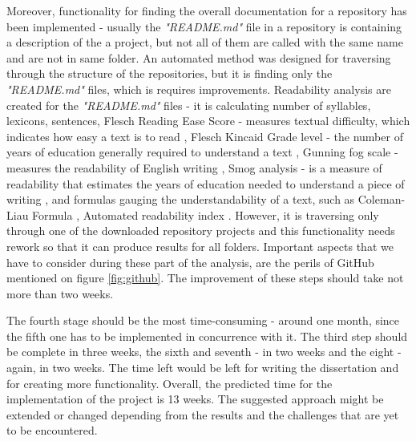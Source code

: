 Moreover, functionality for finding the overall documentation for a repository has been  implemented - usually the \textit{"README.md"} file in a repository is containing a description of the a project, but not all of them are called with the same name and are not in same folder. An automated method was designed for traversing through the structure of the repositories, but it is finding only the \textit{"README.md"} files, which is requires improvements. Readability analysis are created for the \textit{"README.md"} files - it is calculating number of syllables, lexicons, sentences, Flesch Reading Ease Score - measures textual difficulty, which indicates how easy a text is to read \cite{flesch}, Flesch Kincaid Grade level - the number of years of education generally required to understand a text \cite{fleschLevel}, Gunning fog scale - measures the readability of English writing \cite{fogIndex}, Smog analysis -  is a measure of readability that estimates the years of education needed to understand a piece of writing \cite{smog}, and formulas gauging the understandability of a text, such as Coleman-Liau Formula \cite{coleman}, Automated readability index \cite{automated}. However, it is traversing only through one of the downloaded repository projects and this functionality needs rework so that it can produce results for all folders. Important aspects that we have to consider during these part of the analysis, are the perils of GitHub mentioned on figure \ref{fig:github}. The improvement of these steps should take not more than two weeks.

The fourth stage should be the most time-consuming - around one month, since the fifth one has to be implemented in concurrence with it. The third step should be complete in three weeks, the sixth and seventh - in two weeks and the eight - again, in two weeks. The time left would be left for writing the dissertation and for creating more functionality. Overall, the predicted time for the implementation of the project is 13 weeks. The suggested approach might be extended or changed depending from the results and the challenges that are yet to be encountered.